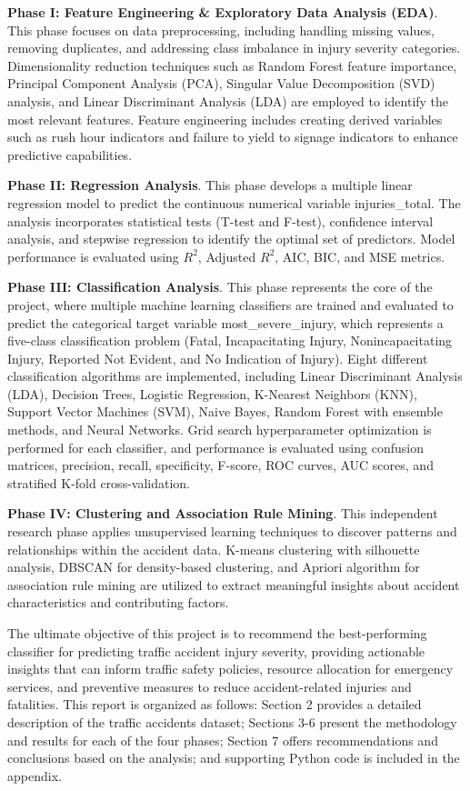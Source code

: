 \documentclass[12pt,man]{apa7}
\begin{document}
\textbf{Phase I: Feature Engineering \& Exploratory Data Analysis (EDA)}. This phase focuses on data preprocessing, including handling missing values, removing duplicates, 
and addressing class imbalance in injury severity categories. Dimensionality reduction techniques such as Random Forest feature importance, Principal Component Analysis (PCA),
Singular Value Decomposition (SVD) analysis, and Linear Discriminant Analysis (LDA) are employed to identify the most relevant features. Feature engineering includes creating 
derived variables such as rush hour indicators and failure to yield to signage indicators to enhance predictive capabilities.

\textbf{Phase II: Regression Analysis}. This phase develops a multiple linear regression model to predict the continuous numerical variable 
injuries\_total. The analysis incorporates statistical tests (T-test and F-test), confidence interval analysis, and stepwise regression
to identify the optimal set of predictors. Model performance is evaluated using $R^2$, Adjusted $R^2$, AIC, BIC, and MSE metrics.

\textbf{Phase III: Classification Analysis}. This phase represents the core of the project, where multiple machine learning classifiers are 
trained and evaluated to predict the categorical target variable most\_severe\_injury, which represents a five-class classification 
problem (Fatal, Incapacitating Injury, Nonincapacitating Injury, Reported Not Evident, and No Indication of Injury). Eight different classification
algorithms are implemented, including Linear Discriminant Analysis (LDA), Decision Trees, Logistic Regression, K-Nearest Neighbors (KNN), 
Support Vector Machines (SVM), Naive Bayes, Random Forest with ensemble methods, and Neural Networks. Grid search hyperparameter optimization 
is performed for each classifier, and performance is evaluated using confusion matrices, precision, recall, specificity, F-score, ROC curves, 
AUC scores, and stratified K-fold cross-validation.

\textbf{Phase IV: Clustering and Association Rule Mining}. This independent research phase applies unsupervised learning techniques to discover
patterns and relationships within the accident data. K-means clustering with silhouette analysis, DBSCAN for density-based clustering, and 
Apriori algorithm for association rule mining are utilized to extract meaningful insights about accident characteristics and contributing factors.

The ultimate objective of this project is to recommend the best-performing classifier for predicting traffic accident injury severity, providing 
actionable insights that can inform traffic safety policies, resource allocation for emergency services, and preventive measures to reduce 
accident-related injuries and fatalities. This report is organized as follows: Section 2 provides a detailed description of the traffic accidents 
dataset; Sections 3-6 present the methodology and results for each of the four phases; Section 7 offers recommendations and conclusions based on 
the analysis; and supporting Python code is included in the appendix.
\end{document}
